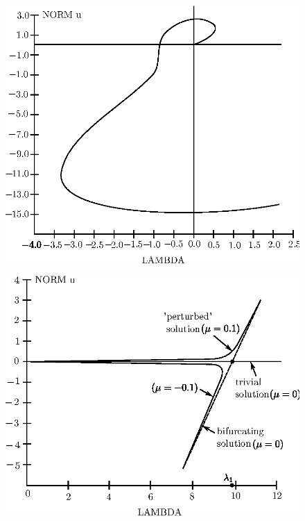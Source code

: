 \begin{figure}[H]
\centering
\includegraphics[scale=0.75]{vol79-fig/fig79-31.eps}
\smallskip
\caption{}\label{chap6-fig6.1}
\end{figure}\pageoriginale
\begin{figure}[H]
\centering
\includegraphics[scale=0.85]{vol79-fig/fig79-32.eps}
\smallskip
\caption{}\label{chap6-fig6.2}
\end{figure}\pageoriginale

